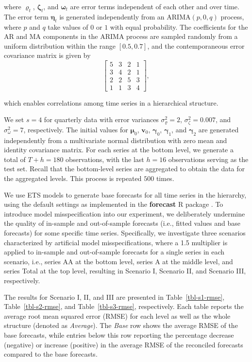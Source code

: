 \documentclass[11pt,a4paper,]{article}
\begin{document}
where \(\boldsymbol{\varrho}_t\), \(\boldsymbol{\zeta}_t\), and
\(\boldsymbol{\omega}_t\) are error terms independent of each other and
over time. The error term \(\boldsymbol{\eta}_t\) is generated
independently from an \(\text{ARIMA}(p,0,q)\) process, where \(p\) and
\(q\) take values of \(0\) or \(1\) with equal probability. The
coefficients for the AR and MA components in the ARIMA process are
sampled randomly from a uniform distribution within the range
\([0.5, 0.7]\), and the contemporaneous error covariance matrix is given
by \[
\left[\begin{array}{llll}
5 & 3 & 2 & 1 \\
3 & 4 & 2 & 1 \\
2 & 2 & 5 & 3 \\
1 & 1 & 3 & 4
\end{array}\right],
\]

which enables correlations among time series in a hierarchical
structure.

We set \(s = 4\) for quarterly data with error variances
\(\sigma_{\varrho}^2=2\), \(\sigma_\zeta^2=0.007\), and
\(\sigma_\omega^2=7\), respectively. The initial values for
\(\boldsymbol{\mu}_0\), \(\boldsymbol{v}_0\), \(\boldsymbol{\gamma}_0\),
\(\boldsymbol{\gamma}_1\), and \(\boldsymbol{\gamma}_2\) are generated
independently from a multivariate normal distribution with zero mean and
identity covariance matrix. For each series at the bottom level, we
generate a total of \(T+h = 180\) observations, with the last \(h = 16\)
observations serving as the test set. Recall that the bottom-level
series are aggregated to obtain the data for the aggregated levels. This
process is repeated \(500\) times.

We use ETS models to generate base forecasts for all time series in the
hierarchy, using the default settings as implemented in the
\textbf{forecast} R package \autocite{Hyndman2023-fc}. To introduce
model misspecification into our experiment, we deliberately undermine
the quality of in-sample and out-of-sample forecasts (i.e., fitted
values and base forecasts) for some specific time series. Specifically,
we investigate three scenarios characterized by artificial model
misspecifications, where a 1.5 multiplier is applied to in-sample and
out-of-sample forecasts for a single series in each scenario, i.e.,
series AA at the bottom level, series A at the middle level, and series
Total at the top level, resulting in Scenario I, Scenario II, and
Scenario III, respectively.

The results for Scenario I, II, and III are presented in
Table~\ref{tbl-s1-rmse}, Table~\ref{tbl-s2-rmse}, and
Table~\ref{tbl-s3-rmse}, respectively. Each table reports the average
root mean squared error (RMSE) for each level as well as the whole
structure (denoted as \emph{Average}). The \emph{Base} row shows the
average RMSE of the base forecasts, while entries below this row
reporting the percentage decrease (negative) or increase (positive) in
the average RMSE of the reconciled forecasts compared to the base
forecasts.
\end{document}
